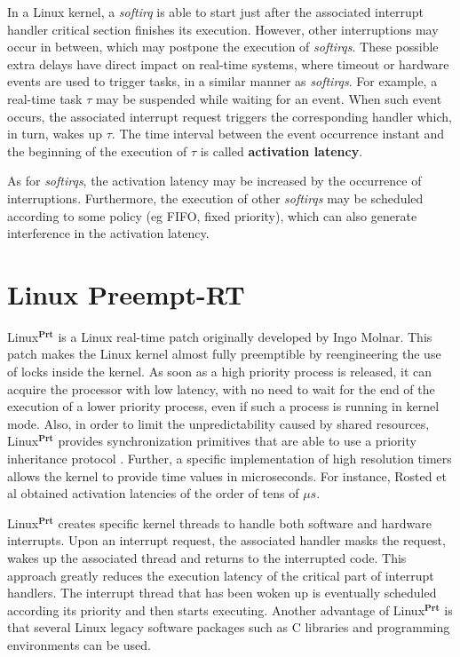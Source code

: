 \documentclass{acm_proc_article-sp}
\begin{document}
In a Linux kernel, a \emph{softirq} is able to start just after the associated
interrupt handler critical section finishes its execution. However, other
interruptions may occur in between, which may postpone the execution of
\emph{softirqs}. These possible extra delays have direct impact on real-time
systems, where timeout or hardware events are used to trigger tasks, in a similar
manner as \emph{softirqs}. For example, a real-time task $\tau$ may be suspended
while waiting for an event. When such event occurs, the associated interrupt
request triggers the corresponding handler which, in turn, wakes up $\tau$. The time
interval between the event occurrence instant and the beginning of the execution of
$\tau$ is called \textbf{activation latency}.

As for \emph{softirqs}, the activation latency may be increased by the occurrence of
interruptions. Furthermore, the execution of other \emph{softirqs} may be scheduled
according to some policy (eg FIFO, fixed priority), which can also generate
interference in the activation latency. 

\section{Linux Preempt-RT}
\label{sec:preemptRT}

Linux$^{\mathbf{Prt}}$ \cite{McKenney05, Rostedt07} is a Linux real-time patch
originally developed by Ingo Molnar.  This patch makes the Linux kernel almost fully
preemptible by reengineering the use of locks inside the kernel.  As soon as a high
priority process is released, it can acquire the processor with low latency,
with no need to wait for the end of the execution of a lower priority process, even
if such a process is running in kernel mode. Also, in order to limit the
unpredictability caused by shared resources, Linux$^{\mathbf{Prt}}$ provides
synchronization primitives that are able to use a priority inheritance protocol
\cite{Sha90}. Further, a specific implementation of high resolution timers
\cite{Kernel} allows the kernel to provide time values in microseconds. For
instance, Rosted et al \cite{Rostedt07, Siro07} obtained activation latencies of the
order of tens of $\mu s$.

Linux$^{\mathbf{Prt}}$ creates specific kernel threads to handle both software and
hardware interrupts.  Upon an interrupt request, the associated handler masks the
request, wakes up the associated thread and returns to the interrupted code. This
approach greatly reduces the execution latency of the critical part of interrupt
handlers. The interrupt thread that has been woken up is eventually scheduled
according its priority and then starts executing.  Another advantage of
Linux$^{\mathbf{Prt}}$ is that several Linux legacy software packages such as C
libraries and programming environments can be used.
\end{document}
